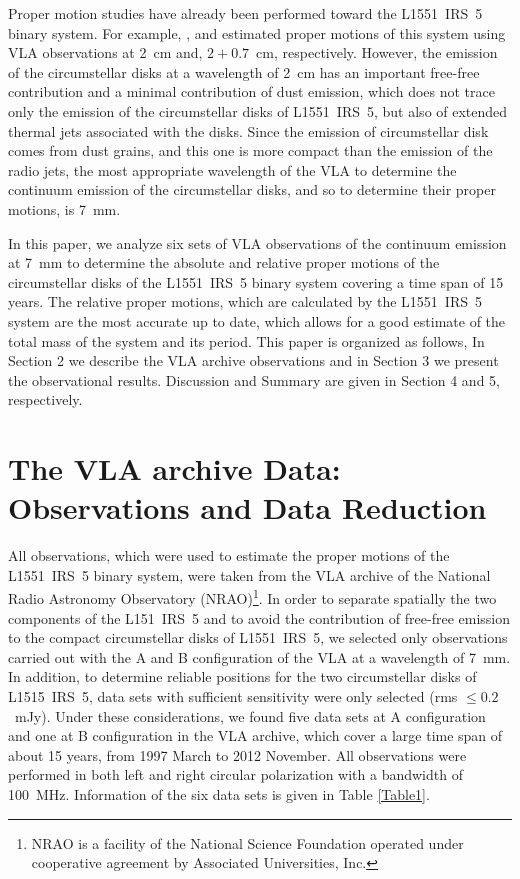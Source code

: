 \documentclass[debug]{rmaa}
\begin{document}
Proper motion studies have already been performed toward the L1551~IRS~5 binary system. 
For example, \citet{Rodriguez2003}, \citet{Lim2006} and \citet{Lim2016}
 estimated proper motions of this system using VLA observations at 2~cm and, 
$2 + 0.7$~cm, respectively. However, the emission of the circumstellar disks at 
a wavelength of 2~cm has an important free-free contribution and a minimal 
contribution of dust emission, which does not trace only the emission of the 
circumstellar disks of L1551~IRS~5, but also of extended thermal jets associated with
the disks.
Since the emission of circumstellar disk comes from dust grains, and this one is
more compact than the emission of the radio jets, the most appropriate
wavelength of the VLA to determine the continuum emission of the circumstellar
disks, and so to determine their proper motions, is 7~mm.

In this paper, we analyze six sets of VLA observations of the continuum emission
at 7~mm to determine the absolute and relative proper motions of the circumstellar
disks of the L1551~IRS~5 binary system covering a time span of 15 years. The relative
proper motions, which are calculated by the L1551~IRS~5 system are the most accurate 
up to date, which allows for a good estimate of the total mass of the system and its period.
This paper is organized as follows, In Section 2 we describe the VLA archive observations
and in Section 3 we present the observational results. Discussion and Summary are given in
Section 4 and 5, respectively.


\section{The VLA archive Data: Observations and Data Reduction}
\label{sec:obser}

All observations, which were used to estimate the proper motions of the L1551~IRS~5 
binary system, were taken from the VLA archive of the National Radio Astronomy Observatory
(NRAO)\footnote{NRAO is a facility of the National Science Foundation operated
under cooperative agreement by Associated Universities, Inc.}. In order to
separate spatially the two components of the L151~IRS~5 and to avoid the contribution
of free-free emission to the compact circumstellar disks of L1551~IRS~5, we selected
only observations carried out with the A and B configuration of the VLA
at a wavelength of 7~mm. In addition, to determine reliable positions for the two
circumstellar disks of L1515~IRS~5, data sets with sufficient sensitivity
were only selected (rms $\le 0.2$~mJy). Under these considerations, we found five data sets at A 
configuration and one at B configuration in the VLA archive, which cover a large 
time span of about 15 years, from 1997 March to 2012 November. All observations
were performed in both left and right circular polarization with a bandwidth of 100~MHz.
Information of the six data sets is given in Table \ref{Table1}.
\end{document}
